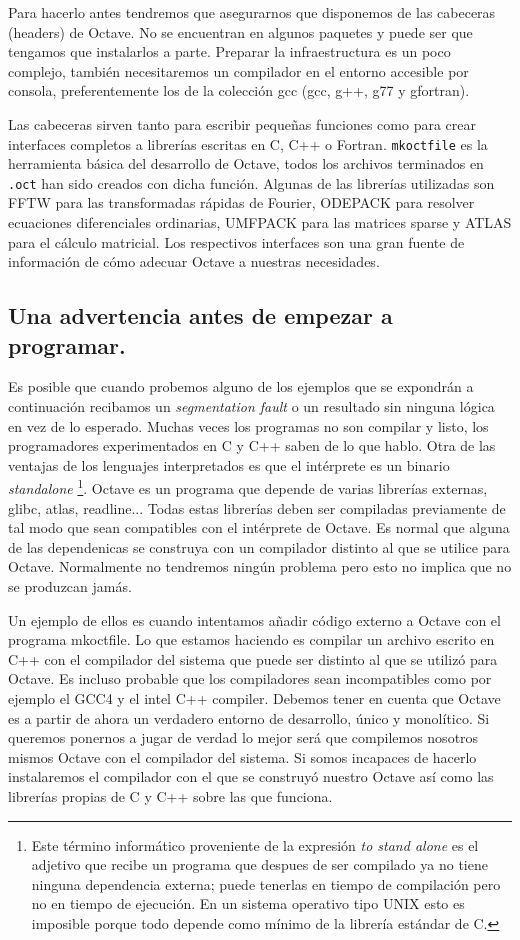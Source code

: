 Para hacerlo antes tendremos que asegurarnos que disponemos de las
cabeceras (headers) de Octave. No se encuentran en algunos paquetes y
puede ser que tengamos que instalarlos a parte. Preparar la
infraestructura es un poco complejo, también necesitaremos un
compilador en el entorno accesible por consola, preferentemente los de
la colección gcc (gcc, g++, g77 y gfortran).

Las cabeceras sirven tanto para escribir pequeñas funciones como para
crear interfaces completos a librerías escritas en C, C++ o Fortran.
\texttt{mkoctfile} es la herramienta básica del desarrollo de Octave,
todos los archivos terminados en \texttt{.oct} han sido creados con
dicha función. Algunas de las librerías utilizadas son FFTW para las
transformadas rápidas de Fourier, ODEPACK para resolver ecuaciones
diferenciales ordinarias, UMFPACK para las matrices sparse y ATLAS
para el cálculo matricial. Los respectivos interfaces son una gran
fuente de información de cómo adecuar Octave a nuestras necesidades.


\subsection{Una advertencia antes de empezar a programar.}

Es posible que cuando probemos alguno de los ejemplos que se expondrán
a continuación recibamos un \emph{segmentation fault} o un resultado
sin ninguna lógica en vez de lo esperado. Muchas veces los programas
no son compilar y listo, los programadores experimentados en C y C++
saben de lo que hablo. Otra de las ventajas de los lenguajes
interpretados es que el intérprete es un binario \emph{standalone}%
\footnote{Este término informático proveniente de la expresión
  \emph{to stand alone} es el adjetivo que recibe un programa que
  despues de ser compilado ya no tiene ninguna dependencia externa;
  puede tenerlas en tiempo de compilación pero no en tiempo de
  ejecución. En un sistema operativo tipo UNIX esto es imposible
  porque todo depende como mínimo de la librería estándar de C.%
}. Octave es un programa que depende de varias librerías
externas, glibc, atlas, readline... Todas estas librerías deben ser
compiladas previamente de tal modo que sean compatibles con el
intérprete de Octave. Es normal que alguna de las dependenicas se
construya con un compilador distinto al que se utilice para Octave.
Normalmente no tendremos ningún problema pero esto no implica que no
se produzcan jamás.

Un ejemplo de ellos es cuando intentamos añadir código externo a
Octave con el programa mkoctfile. Lo que estamos haciendo es compilar
un archivo escrito en C++ con el compilador del sistema que puede ser
distinto al que se utilizó para Octave. Es incluso probable que los
compiladores sean incompatibles como por ejemplo el GCC4 y el intel
C++ compiler. Debemos tener en cuenta que Octave es a partir de ahora
un verdadero entorno de desarrollo, único y monolítico. Si queremos
ponernos a jugar de verdad lo mejor será que compilemos nosotros
mismos Octave con el compilador del sistema. Si somos incapaces de
hacerlo instalaremos el compilador con el que se construyó nuestro
Octave así como las librerías propias de C y C++ sobre las que
funciona.

